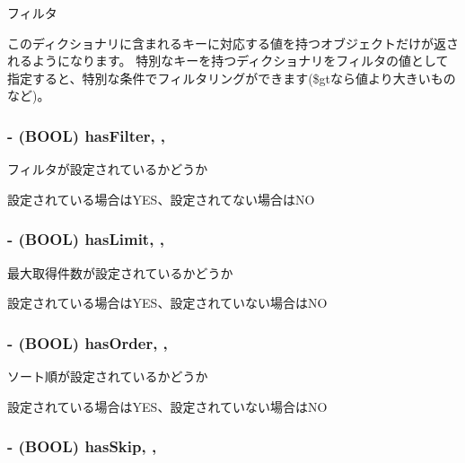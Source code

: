 フィルタ 

このディクショナリに含まれるキーに対応する値を持つオブジェクトだけが返されるようになります。 特別なキーを持つディクショナリをフィルタの値として指定すると、特別な条件でフィルタリングができます(\$gtなら値より大きいものなど)。 \hypertarget{interface_b_d_query_aff2b42885480ebf1d6311089f2be27be}{
\subsubsection[{has\-Filter}]{\setlength{\rightskip}{0pt plus 5cm}-\/ (B\-O\-O\-L) has\-Filter\hspace{0.3cm}{\ttfamily [read]}, {\ttfamily [atomic]}, {\ttfamily [assign]}}}\label{interface_b_d_query_aff2b42885480ebf1d6311089f2be27be}


フィルタが設定されているかどうか 

設定されている場合は\-Y\-E\-S、設定されてない場合は\-N\-O \hypertarget{interface_b_d_query_a71b336b5fbf46e03f96fc5f36affc84f}{
\subsubsection[{has\-Limit}]{\setlength{\rightskip}{0pt plus 5cm}-\/ (B\-O\-O\-L) has\-Limit\hspace{0.3cm}{\ttfamily [read]}, {\ttfamily [atomic]}, {\ttfamily [assign]}}}\label{interface_b_d_query_a71b336b5fbf46e03f96fc5f36affc84f}


最大取得件数が設定されているかどうか 

設定されている場合は\-Y\-E\-S、設定されていない場合は\-N\-O \hypertarget{interface_b_d_query_a73fe1299cda260c7a06c941aaf0dd00c}{
\subsubsection[{has\-Order}]{\setlength{\rightskip}{0pt plus 5cm}-\/ (B\-O\-O\-L) has\-Order\hspace{0.3cm}{\ttfamily [read]}, {\ttfamily [atomic]}, {\ttfamily [assign]}}}\label{interface_b_d_query_a73fe1299cda260c7a06c941aaf0dd00c}


ソート順が設定されているかどうか 

設定されている場合は\-Y\-E\-S、設定されていない場合は\-N\-O \hypertarget{interface_b_d_query_ac5cd3fcf3939d73daada130a4838b59b}{
\subsubsection[{has\-Skip}]{\setlength{\rightskip}{0pt plus 5cm}-\/ (B\-O\-O\-L) has\-Skip\hspace{0.3cm}{\ttfamily [read]}, {\ttfamily [atomic]}, {\ttfamily [assign]}}}\label{interface_b_d_query_ac5cd3fcf3939d73daada130a4838b59b}


